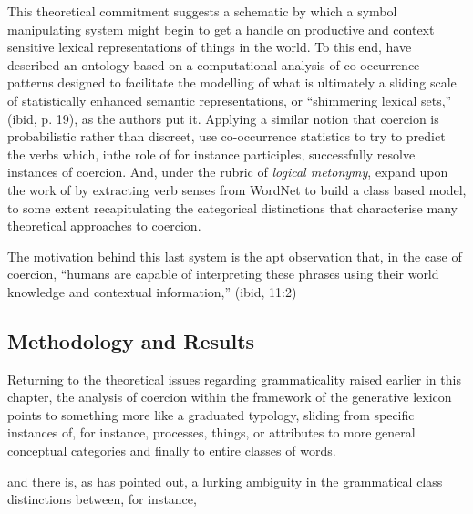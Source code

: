 This theoretical commitment suggests a schematic by which a symbol manipulating system might begin to get a handle on productive and context sensitive lexical representations of things in the world.  To this end, \cite{JezekEA2010} have described an ontology based on a computational analysis of co-occurrence patterns designed to facilitate the modelling of what is ultimately a sliding scale of statistically enhanced semantic representations, or ``shimmering lexical sets,'' (ibid, p. 19), as the authors put it.  Applying a similar notion that coercion is probabilistic rather than discreet, \cite{LapataEA2003} use co-occurrence statistics to try to predict the verbs which, inthe role of for instance participles, successfully resolve instances of coercion.  And, under the rubric of \emph{logical metonymy}, \cite{ShutovaEA2013b} expand upon the work of \citeauthor{LapataEA2003} by extracting verb senses from WordNet to build a class based model, to some extent recapitulating the categorical distinctions that characterise many theoretical approaches to coercion.

The motivation behind this last system is the apt observation that, in the case of coercion, ``humans are capable of interpreting these phrases using their world knowledge and contextual information,'' (ibid, 11:2)

\subsection{Methodology and Results}
Returning to the theoretical issues regarding grammaticality raised earlier in this chapter, the analysis of coercion within the framework of the generative lexicon points to something more like a graduated typology, sliding from specific instances of, for instance, processes, things, or attributes to more general conceptual categories and finally to entire classes of words.

and there is, as \cite{Langacker} has pointed out, a lurking ambiguity in the grammatical class distinctions between, for instance, 


